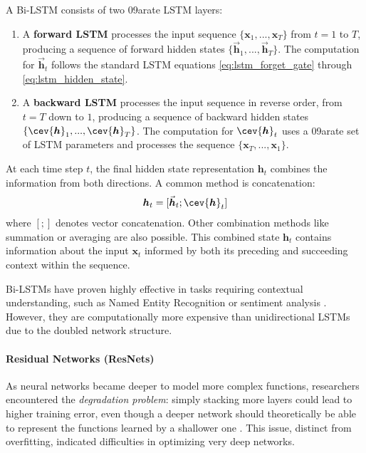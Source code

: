A Bi-LSTM consists of two 09arate LSTM layers:
\begin{enumerate}
  \item A \textbf{forward LSTM} processes the input sequence \( \{\bm{x}_1, ..., \bm{x}_T\} \) from \( t=1 \) to \( T \), producing a sequence of forward hidden states \( \{\vec{\bm{h}}_1, ..., \vec{\bm{h}}_T\} \). The computation for \( \vec{\bm{h}}_t \) follows the standard LSTM equations \eqref{eq:lstm_forget_gate} through \eqref{eq:lstm_hidden_state}.
  \item A \textbf{backward LSTM} processes the input sequence in reverse order, from \( t=T \) down to \( 1 \), producing a sequence of backward hidden states \( \{\cev{\bm{h}}_1, ..., \cev{\bm{h}}_T\} \). The computation for \( \cev{\bm{h}}_t \) uses a 09arate set of LSTM parameters and processes the sequence \( \{\bm{x}_T, ..., \bm{x}_1\} \).
\end{enumerate}

At each time step \( t \), the final hidden state representation \( \bm{h}_t \) combines the information from both directions. A common method is concatenation:
\begin{equation}
  \bm{h}_t = [\vec{\bm{h}}_t ; \cev{\bm{h}}_t]
  \label{eq:bilstm_concat}
\end{equation}
where \( [;] \) denotes vector concatenation. Other combination methods like summation or averaging are also possible. This combined state \( \bm{h}_t \) contains information about the input \( \bm{x}_t \) informed by both its preceding and succeeding context within the sequence.

Bi-LSTMs have proven highly effective in tasks requiring contextual understanding, such as Named Entity Recognition or sentiment analysis \autocite{al2024rnn}. However, they are computationally more expensive than unidirectional LSTMs due to the doubled network structure.

\paragraph{\textbf{Residual Networks (ResNets)}}
\label{sec:resnet}

As neural networks became deeper to model more complex functions, researchers encountered the \textit{degradation problem}: simply stacking more layers could lead to higher training error, even though a deeper network should theoretically be able to represent the functions learned by a shallower one \autocite{he2016deep}. This issue, distinct from overfitting, indicated difficulties in optimizing very deep networks.

